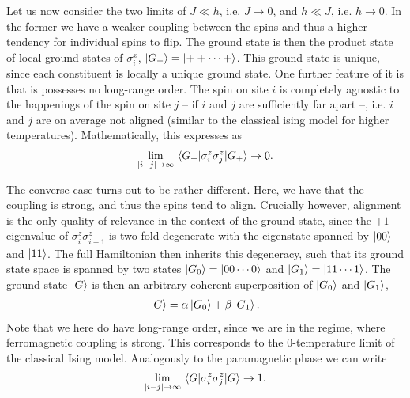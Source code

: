 Let us now consider the two limits of $J \ll h$, i.e. $J\to 0$,  and $h \ll J$,
i.e. $h \to 0$. In the former we have a weaker coupling between the spins and
thus a higher tendency for individual spins to flip. The ground state is then
the product state of local ground states of $\sigma_i^x$, $\ket{G_+} =
\ket{++\cdots +}$. This ground state is unique, since each constituent is
locally a
unique ground state. One further feature of it is that is possesses no
long-range order. The spin on site $i$ is completely agnostic to the happenings
of the spin on site $j$ -- if $i$ and $j$ are sufficiently far apart --, i.e.
$i$ and $j$ are on
average not aligned (similar to the classical ising model for higher
temperatures). Mathematically, this expresses as 
\begin{align}
\lim_{\abs{i-j}\to\infty} \expval{\sigma_i^z\sigma_j^z}{G_+} \to 0
.\end{align}

The converse case turns out to be rather different. Here, we have that the
coupling is strong, and thus the spins tend to align. Crucially however,
alignment is the only quality of relevance in the context of the ground state,
since the $+1$ eigenvalue of $\sigma_i^z\sigma_{i+1}^z$ is two-fold degenerate
with the eigenstate spanned by $\ket{00}$ and $\ket{11}$. The full Hamiltonian
then inherits this degeneracy, such that its ground state space is spanned by
two states $\ket{G_0} = \ket{00\cdots 0}$ and $\ket{G_1} = \ket{11\cdots 1}$.
The ground state $\ket{G}$ is then an arbitrary coherent superposition of $\ket{G_0}$ and
$\ket{G_1}$,
\begin{align}
  \ket{G} = \alpha \ket{G_0} + \beta \ket{G_1}
.\end{align}
Note that we here do have long-range order, since we are in the
regime, where ferromagnetic coupling is strong. This corresponds to the
0-temperature limit of the classical Ising model. Analogously to the
paramagnetic phase we can write
\begin{align}
  \lim_{\abs{i-j}\to\infty} \expval{\sigma_i^z\sigma_j^z}{G} \to 1
.\end{align}

